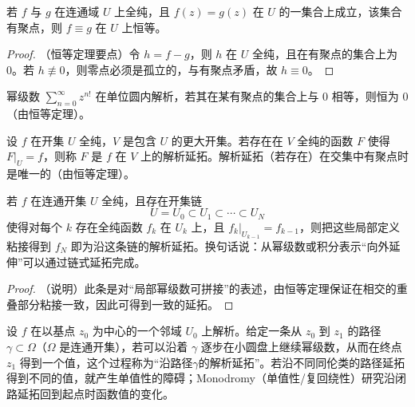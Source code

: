 \documentclass[lang=cn,10pt]{elegantbook}
\begin{document}
		\begin{definition}
		若 \(f\) 与 \(g\) 在连通域 \(U\) 上全纯，且 \(f(z)=g(z)\) 在 \(U\) 的一集合上成立，该集合有聚点，则 \(f\equiv g\) 在 \(U\) 上恒等。
	\end{definition}
	
	\begin{proof}
		（恒等定理要点）令 \(h=f-g\)，则 \(h\) 在 \(U\) 全纯，且在有聚点的集合上为 0。若 \(h\not\equiv0\)，则零点必须是孤立的，与有聚点矛盾，故 \(h\equiv0\)。
	\end{proof}
	
	\begin{example}
		幂级数 \(\sum_{n=0}^\infty z^{n!}\) 在单位圆内解析，若其在某有聚点的集合上与 0 相等，则恒为 0（由恒等定理）。
	\end{example}
	
	\begin{definition}
		设 \(f\) 在开集 \(U\) 全纯，\(V\) 是包含 \(U\) 的更大开集。若存在在 \(V\) 全纯的函数 \(F\) 使得 \(F|_U=f\)，则称 \(F\) 是 \(f\) 在 \(V\) 上的解析延拓。解析延拓（若存在）在交集中有聚点时是唯一的（由恒等定理）。
	\end{definition}
	
	\begin{definition}
		若 \(f\) 在连通开集 \(U\) 全纯，且存在开集链
		\[
		U=U_0\subset U_1\subset\cdots\subset U_N
		\]
		使得对每个 \(k\) 存在全纯函数 \(f_k\) 在 \(U_k\) 上，且 \(f_k|_{U_{k-1}}=f_{k-1}\)，则把这些局部定义粘接得到 \(f_N\) 即为沿这条链的解析延拓。换句话说：从幂级数或积分表示“向外延伸”可以通过链式延拓完成。
	\end{definition}
	
	\begin{proof}
		（说明）此条是对“局部幂级数可拼接”的表述，由恒等定理保证在相交的重叠部分粘接一致，因此可得到一致的延拓。
	\end{proof}
	
	\begin{definition}
		设 \(f\) 在以基点 \(z_0\) 为中心的一个邻域 \(U_0\) 上解析。给定一条从 \(z_0\) 到 \(z_1\) 的路径 \(\gamma\subset\Omega\)（\(\Omega\) 是连通开集），若可以沿着 \(\gamma\) 逐步在小圆盘上继续幂级数，从而在终点 \(z_1\) 得到一个值，这个过程称为“沿路径\(\gamma\)的解析延拓”。若沿不同同伦类的路径延拓得到不同的值，就产生单值性的障碍；Monodromy（单值性/复回绕性）研究沿闭路延拓回到起点时函数值的变化。
	\end{definition}
	
\end{document}
